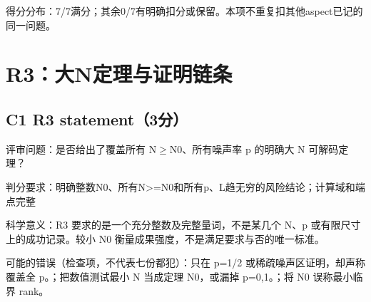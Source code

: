 \documentclass[11pt,a4paper]{article}
\begin{document}
得分分布：7/7满分；其余0/7有明确扣分或保留。本项不重复扣其他aspect已记的同一问题。

\clearpage
\section{R3：大N定理与证明链条}
\subsection{C1 R3 statement（3分）}
\label{aspect:C1}
评审问题：是否给出了覆盖所有 N\ensuremath{\geq}N0、所有噪声率 p 的明确大 N 可解码定理？

判分要求：明确整数N0、所有N>=N0和所有p、L趋无穷的风险结论；计算域和端点完整

科学意义：R3 要求的是一个充分整数及完整量词，不是某几个 N、p 或有限尺寸上的成功记录。较小 N0 衡量成果强度，不是满足要求与否的唯一标准。

可能的错误（检查项，不代表七份都犯）：只在 p=1/2 或稀疏噪声区证明，却声称覆盖全 p。；把数值测试最小 N 当成定理 N0，或漏掉 p=0,1。；将 N0 误称最小临界 rank。
\end{document}
